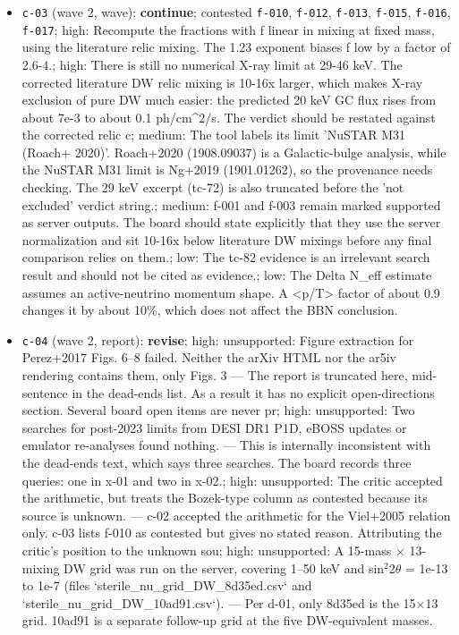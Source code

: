 \documentclass[11pt,a4paper]{article}
\begin{document}
\begin{itemize}
  \item \texttt{c-03} (wave 2, wave): \textbf{continue}; contested \texttt{f-010}, \texttt{f-012}, \texttt{f-013}, \texttt{f-015}, \texttt{f-016}, \texttt{f-017}; high: Recompute the fractions with f linear in mixing at fixed mass, using the literature relic mixing. The 1.23 exponent biases f low by a factor of 2.6-4.; high: There is still no numerical X-ray limit at 29-46 keV. The corrected literature DW relic mixing is 10-16x larger, which makes X-ray exclusion of pure DW much easier: the predicted 20 keV GC flux rises from about 7e-3 to about 0.1 ph/cm\textasciicircum{}2/s. The verdict should be restated against the corrected relic c; medium: The tool labels its limit 'NuSTAR M31 (Roach+ 2020)'. Roach+2020 (1908.09037) is a Galactic-bulge analysis, while the NuSTAR M31 limit is Ng+2019 (1901.01262), so the provenance needs checking. The 29 keV excerpt (tc-72) is also truncated before the 'not excluded' verdict string.; medium: f-001 and f-003 remain marked supported as server outputs. The board should state explicitly that they use the server normalization and sit 10-16x below literature DW mixings before any final comparison relies on them.; low: The tc-82 evidence is an irrelevant search result and should not be cited as evidence.; low: The Delta N\_eff estimate assumes an active-neutrino momentum shape. A \textless{}p/T\textgreater{} factor of about 0.9 changes it by about 10\%, which does not affect the BBN conclusion.
  \item \texttt{c-04} (wave 2, report): \textbf{revise}; high: unsupported: Figure extraction for Perez+2017 Figs. 6--8 failed. Neither the arXiv HTML nor the ar5iv rendering contains them, only Figs. 3 --- The report is truncated here, mid-sentence in the dead-ends list. As a result it has no explicit open-directions section. Several board open items are never pr; high: unsupported: Two searches for post-2023 limits from DESI DR1 P1D, eBOSS updates or emulator re-analyses found nothing. --- This is internally inconsistent with the dead-ends text, which says three searches. The board records three queries: one in x-01 and two in x-02.; high: unsupported: The critic accepted the arithmetic, but treats the Bozek-type column as contested because its source is unknown. --- c-02 accepted the arithmetic for the Viel+2005 relation only. c-03 lists f-010 as contested but gives no stated reason. Attributing the critic's position to the unknown sou; high: unsupported: A 15-mass $\times$ 13-mixing DW grid was run on the server, covering 1--50 keV and sin$^2$2$\theta$ = 1e-13 to 1e-7 (files `sterile\_nu\_grid\_DW\_8d35ed.csv` and `sterile\_nu\_grid\_DW\_10ad91.csv`). --- Per d-01, only 8d35ed is the 15$\times$13 grid. 10ad91 is a separate follow-up grid at the five DW-equivalent masses.
\end{itemize}
\end{document}
